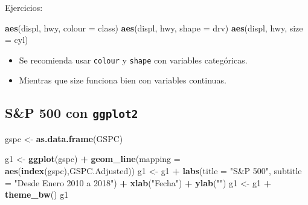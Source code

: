 \documentclass[12pt,]{book}
\newenvironment{Shaded}{\begin{snugshade}}{\end{snugshade}}
\newcommand{\KeywordTok}[1]{\textcolor[rgb]{0.13,0.29,0.53}{\textbf{#1}}}
\newcommand{\DataTypeTok}[1]{\textcolor[rgb]{0.13,0.29,0.53}{#1}}
\newcommand{\StringTok}[1]{\textcolor[rgb]{0.31,0.60,0.02}{#1}}
\newcommand{\OperatorTok}[1]{\textcolor[rgb]{0.81,0.36,0.00}{\textbf{#1}}}
\newcommand{\NormalTok}[1]{#1}
\providecommand{\tightlist}{%
  \setlength{\itemsep}{0pt}\setlength{\parskip}{0pt}}
\begin{document}
Ejercicios:

\begin{Shaded}
\begin{Highlighting}[]
\KeywordTok{aes}\NormalTok{(displ, hwy, }\DataTypeTok{colour =}\NormalTok{ class)}
\KeywordTok{aes}\NormalTok{(displ, hwy, }\DataTypeTok{shape =}\NormalTok{ drv)}
\KeywordTok{aes}\NormalTok{(displ, hwy, }\DataTypeTok{size =}\NormalTok{ cyl)}
\end{Highlighting}
\end{Shaded}

\begin{itemize}
\tightlist
\item
  Se recomienda usar \texttt{colour} y \texttt{shape} con variables
  categóricas.\\
\item
  Mientras que size funciona bien con variables continuas.
\end{itemize}

\subsection{\texorpdfstring{S\&P 500 con
\texttt{ggplot2}}{S\&P 500 con ggplot2}}\label{sp-500-con-ggplot2}

\begin{Shaded}
\begin{Highlighting}[]
\NormalTok{gspc <-}\StringTok{ }\KeywordTok{as.data.frame}\NormalTok{(GSPC)}
\end{Highlighting}
\end{Shaded}

\begin{Shaded}
\begin{Highlighting}[]
\NormalTok{g1 <-}\StringTok{ }\KeywordTok{ggplot}\NormalTok{(gspc) }\OperatorTok{+}\StringTok{ }\KeywordTok{geom_line}\NormalTok{(}\DataTypeTok{mapping =} \KeywordTok{aes}\NormalTok{(}\KeywordTok{index}\NormalTok{(gspc),GSPC.Adjusted))}
\NormalTok{g1 <-}\StringTok{ }\NormalTok{g1 }\OperatorTok{+}\StringTok{ }\KeywordTok{labs}\NormalTok{(}\DataTypeTok{title =} \StringTok{"S&P 500"}\NormalTok{, }\DataTypeTok{subtitle =} \StringTok{"Desde Enero 2010 a 2018"}\NormalTok{) }\OperatorTok{+}\StringTok{ }\KeywordTok{xlab}\NormalTok{(}\StringTok{"Fecha"}\NormalTok{) }\OperatorTok{+}\StringTok{ }\KeywordTok{ylab}\NormalTok{(}\StringTok{""}\NormalTok{)}
\NormalTok{g1 <-}\StringTok{ }\NormalTok{g1 }\OperatorTok{+}\StringTok{ }\KeywordTok{theme_bw}\NormalTok{()}
\NormalTok{g1}
\end{Highlighting}
\end{Shaded}
\end{document}
